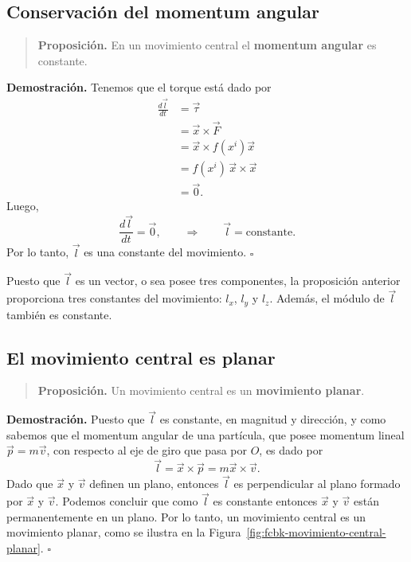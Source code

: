 \documentclass[../apunte_mecanica_clasica.tex]{subfiles}%
\begin{document}
\subsection{Conservación del momentum angular}

\begin{quote}
\textbf{Proposición.} En un movimiento central el \textbf{momentum angular} es constante.
\end{quote}

\noindent
\textbf{Demostración.} Tenemos que el torque está dado por
\begin{equation}
    \begin{aligned}
        \frac{d\vec l}{dt}
        &= \vec\tau \\
        &= \vec x \times \vec F \\
        &= \vec x \times f(x^i)\vec x \\
        &= f(x^i)\,\vec x\times \vec x \\
        &= \vec 0 .
    \end{aligned}
    \label{eq:fcbk-torque-fuerza-central}
\end{equation}
Luego,
\begin{equation}
    \frac{d\vec l}{dt}=\vec 0,
    \qquad \Longrightarrow \qquad
    \vec l=\text{constante}.
    \label{eq:fcbk-momentum-angular-constante}
\end{equation}
Por lo tanto, $\vec l$ es una constante del movimiento. \hfill $\square$

Puesto que $\vec l$ es un vector, o sea posee tres componentes, la proposición anterior proporciona tres constantes del movimiento: $l_x$, $l_y$ y $l_z$. Además, el módulo de $\vec l$ también es constante.

\subsection{El movimiento central es planar}

\begin{quote}
\textbf{Proposición.} Un movimiento central es un \textbf{movimiento planar}.
\end{quote}

\noindent
\textbf{Demostración.} Puesto que $\vec l$ es constante, en magnitud y dirección, y como sabemos que el momentum angular de una partícula, que posee momentum lineal $\vec p=m\vec v$, con respecto al eje de giro que pasa por $O$, es dado por
\begin{equation}
    \vec l=\vec x\times \vec p = m\vec x\times \vec v .
    \label{eq:fcbk-def-momentum-angular}
\end{equation}
Dado que $\vec x$ y $\vec v$ definen un plano, entonces $\vec l$ es perpendicular al plano formado por $\vec x$ y $\vec v$. Podemos concluir que como $\vec l$ es constante entonces $\vec x$ y $\vec v$ están permanentemente en un plano. Por lo tanto, un movimiento central es un movimiento planar, como se ilustra en la Figura~\ref{fig:fcbk-movimiento-central-planar}. \hfill $\square$
\end{document}
